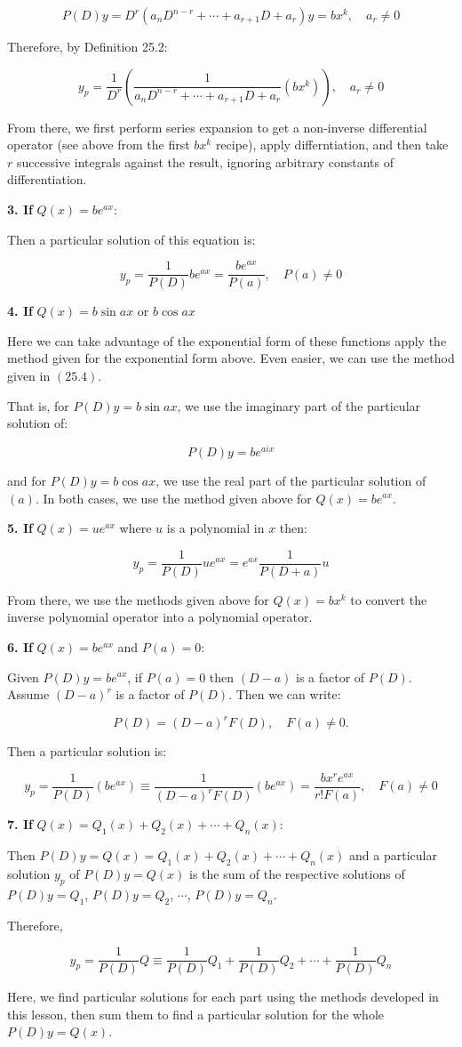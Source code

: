 \documentclass{article}
\begin{document}
\[ \tag{a} P(D)y = D^r (a_n D^{n-r} + \cdots + a_{r+1} D + a_r)y = bx^k, \quad a_r \neq 0 \]

Therefore, by Definition 25.2:

\[ \tag{25.34} y_p = \frac{1}{D^r}(\frac{1}{a_n D^{n-r} + \cdots + a_{r+1} D + a_r}(bx^k)), \quad a_r \neq 0 \] 

From there, we first perform series expansion to get a non-inverse differential operator (see above from the first $bx^k$ recipe), apply differntiation, and then take $r$ successive integrals against the result, ignoring arbitrary constants of differentiation.

\textbf{3. If} $Q(x) = be^{ax}$:

Then a particular solution of this equation is:

\[ \tag{25.4} y_p = \frac{1}{P(D)} be^{ax} = \frac{be^{ax}}{P(a)}, \quad P(a) \neq 0 \]

\textbf{4. If} $Q(x) = b\sin{ax}$ or $b\cos{ax}$

Here we can take advantage of the exponential form of these functions apply the method given for the exponential form above. Even easier, we can use
the method given in $(25.4)$.

That is, for $P(D)y = b\sin{ax}$, we use the imaginary part of the particular solution of:

\[ \tag{a} P(D)y = be^{aix} \]

and for $P(D)y = b\cos{ax}$, we use the real part of the particular solution of $(a)$. In both cases, we use the method given above for $Q(x) = be^{ax}$.

\textbf{5. If} $Q(x) = ue^{ax}$ where $u$ is a polynomial in $x$ then:

\[ \tag{25.51} y_p = \frac{1}{P(D)}ue^{ax} = e^{ax} \frac{1}{P(D + a)}u \]

From there, we use the methods given above for $Q(x) = bx^k$ to convert the inverse polynomial operator into a polynomial operator.

\textbf{6. If} $Q(x) = be^{ax}$ and $P(a) = 0$:

Given $P(D)y = be^{ax}$, if $P(a) = 0$ then $(D - a)$ is a factor of $P(D)$. Assume $(D - a)^r$ is a factor of $P(D)$. Then we can write:

\[ \tag{a} P(D) = (D - a)^r F(D), \quad F(a) \neq 0. \]

Then a particular solution is:

\[ \tag{25.6} y_p = \frac{1}{P(D)} (be^{ax}) \equiv \frac{1}{(D - a)^r F(D)} (be^{ax}) = \frac{bx^re^{ax}}{r!F(a)}, \quad F(a) \neq 0 \]

\textbf{7. If} $Q(x) = Q_1(x) + Q_2(x) + \cdots + Q_n(x)$:

Then $P(D)y = Q(x) = Q_1(x) + Q_2(x) + \cdots + Q_n(x)$ and a particular solution $y_p$ of $P(D)y = Q(x)$ is the sum of the respective solutions of $P(D)y = Q_1$, $P(D)y = Q_2$, $\cdots$, $P(D)y = Q_n$.

Therefore,

\[ \tag{25.6} y_p = \frac{1}{P(D)}Q \equiv \frac{1}{P(D)} Q_1 + \frac{1}{P(D)} Q_2 + \cdots + \frac{1}{P(D)} Q_n \]

Here, we find particular solutions for each part using the methods developed in this lesson, then sum them to find a particular solution for the whole $P(D)y = Q(x)$.
\end{document}
